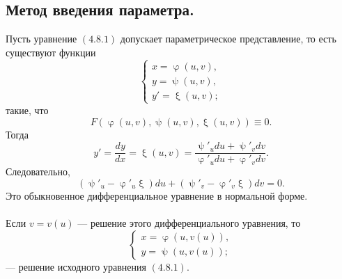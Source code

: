 \documentclass[a4paper, 12pt]{report}
\renewcommand{\varphi}{\upvarphi}
\renewcommand{\psi}{\uppsi}
\renewcommand{\xi}{\upxi}
\begin{document}
\subsection{Метод введения параметра.}
Пусть уравнение $(4.8.1)$ допускает параметрическое представление, то есть существуют функции
$$\begin{cases}
	x = \varphi(u, v),\\
	y = \psi(u, v),\\
	y' = \xi(u, v);
\end{cases}$$ такие, что $$F(\varphi(u, v), \psi(u, v), \xi(u, v)) \equiv 0.$$
Тогда $$y' = \frac{dy}{dx} = \xi(u, v) = \frac{\psi'_u du + \psi'_v dv}{\varphi'_u du + \varphi'_v dv}.$$
Следовательно, $$(\psi'_u - \varphi'_u\xi)du + (\psi'_v - \varphi'_v\xi)dv = 0.$$
Это обыкновенное дифференциальное уравнение в нормальной форме.\\\\
Если $v = v(u)$ --- решение этого дифференциального уравнения, то 
$$\begin{cases}
	x = \varphi(u, v(u)),\\
	y = \psi(u, v(u));
\end{cases}$$ --- решение исходного уравнения $(4.8.1)$.
\end{document}
